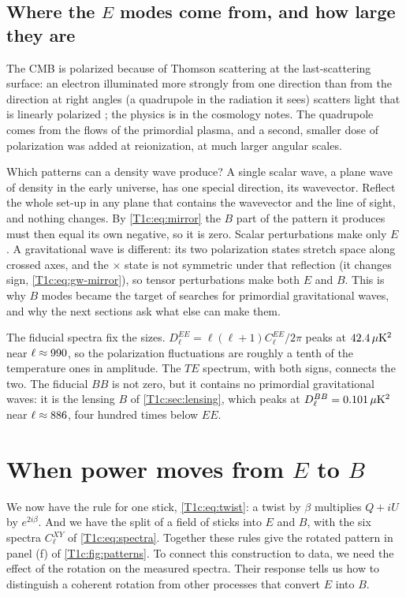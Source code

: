 \subsection{Where the \texorpdfstring{$E$}{E} modes come from, and how large they are}
\label{T1c:sec:e-origin}

The CMB is polarized because of Thomson scattering at the last-scattering surface: an electron illuminated more strongly from one direction than from the direction at right angles (a quadrupole in the radiation it sees) scatters light that is linearly polarized \cite{HuWhite1997Pol}; the physics is in the cosmology notes. The quadrupole comes from the flows of the primordial plasma, and a second, smaller dose of polarization was added at reionization, at much larger angular scales.

Which patterns can a density wave produce? A single scalar wave, a plane wave of density in the early universe, has one special direction, its wavevector. Reflect the whole set-up in any plane that contains the wavevector and the line of sight, and nothing changes. By \eqref{T1c:eq:mirror} the $B$ part of the pattern it produces must then equal its own negative, so it is zero. Scalar perturbations make only $E$ \cite{Kamionkowski1997,SeljakZaldarriaga1997}. A gravitational wave is different: its two polarization states stretch space along crossed axes, and the $\times$ state is not symmetric under that reflection (it changes sign, \cref{T1c:eq:gw-mirror}), so tensor perturbations make both $E$ and $B$. This is why $B$ modes became the target of searches for primordial gravitational waves, and why the next sections ask what else can make them.

The fiducial spectra fix the sizes. $D_\ell^{EE}=\ell(\ell+1)C_\ell^{EE}/2\pi$ peaks at $42.4\,\mu\mathrm K^2$ near $\ell\approx990$, so the polarization fluctuations are roughly a tenth of the temperature ones in amplitude. The $TE$ spectrum, with both signs, connects the two. The fiducial $BB$ is not zero, but it contains no primordial gravitational waves: it is the lensing $B$ of \cref{T1c:sec:lensing}, which peaks at $D_\ell^{BB}=0.101\,\mu\mathrm K^2$ near $\ell\approx886$, four hundred times below $EE$.
\section{When power moves from \texorpdfstring{$E$}{E} to \texorpdfstring{$B$}{B}}
\label{T1c:sec:rotation}

We now have the rule for one stick, \eqref{T1c:eq:twist}: a twist by $\beta$ multiplies $Q+iU$ by $e^{2i\beta}$. And we have the split of a field of sticks into $E$ and $B$, with the six spectra $C_\ell^{XY}$ of \eqref{T1c:eq:spectra}. Together these rules give the rotated pattern in panel (f) of
\cref{T1c:fig:patterns}. To connect this construction to data, we need the
effect of the rotation on the measured spectra. Their response tells us how
to distinguish a coherent rotation from other processes that convert $E$
into $B$.

